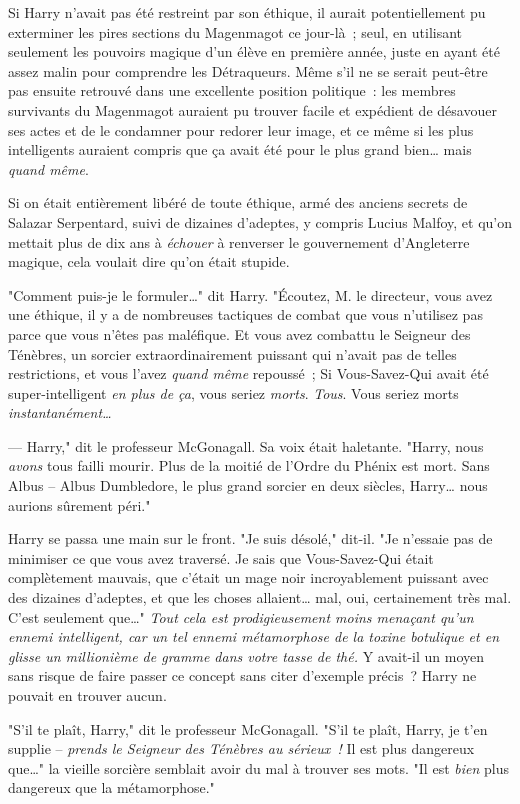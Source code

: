 Si Harry n'avait pas été restreint par son éthique, il aurait potentiellement pu exterminer les pires sections du Magenmagot ce jour-là~; seul, en utilisant seulement les pouvoirs magique d'un élève en première année, juste en ayant été assez malin pour comprendre les Détraqueurs. Même s'il ne se serait peut-être pas ensuite retrouvé dans une excellente position politique~: les membres survivants du Magenmagot auraient pu trouver facile et expédient de désavouer ses actes et de le condamner pour redorer leur image, et ce même si les plus intelligents auraient compris que ça avait été pour le plus grand bien… mais \emph{quand même}.

Si on était entièrement libéré de toute éthique, armé des anciens secrets de Salazar Serpentard, suivi de dizaines d'adeptes, y compris Lucius Malfoy, et qu'on mettait plus de dix ans à \emph{échouer} à renverser le gouvernement d'Angleterre magique, cela voulait dire qu'on était stupide.

"Comment puis-je le formuler…" dit Harry. "Écoutez, M. le directeur, vous avez une éthique, il y a de nombreuses tactiques de combat que vous n'utilisez pas parce que vous n'êtes pas maléfique. Et vous avez combattu le Seigneur des Ténèbres, un sorcier extraordinairement puissant qui n'avait pas de telles restrictions, et vous l'avez \emph{quand même} repoussé~; Si Vous-Savez-Qui avait été super-intelligent \emph{en plus de ça}, vous seriez \emph{morts}. \emph{Tous}. Vous seriez morts \emph{instantanément…}

--- Harry," dit le professeur McGonagall. Sa voix était haletante. "Harry, nous \emph{avons} tous failli mourir. Plus de la moitié de l'Ordre du Phénix est mort. Sans Albus -- Albus Dumbledore, le plus grand sorcier en deux siècles, Harry… nous aurions sûrement péri."

Harry se passa une main sur le front. "Je suis désolé," dit-il. "Je n'essaie pas de minimiser ce que vous avez traversé. Je sais que Vous-Savez-Qui était complètement mauvais, que c'était un mage noir incroyablement puissant avec des dizaines d'adeptes, et que les choses allaient… mal, oui, certainement très mal. C'est seulement que…" \emph{Tout cela est prodigieusement moins menaçant qu'un ennemi intelligent, car un tel ennemi métamorphose de la toxine botulique et en glisse un millionième de gramme dans votre tasse de thé.} Y avait-il un moyen sans risque de faire passer ce concept sans citer d'exemple précis~? Harry ne pouvait en trouver aucun.

"S'il te plaît, Harry," dit le professeur McGonagall. "S'il te plaît, Harry, je t'en supplie -- \emph{prends le Seigneur des Ténèbres au sérieux~!} Il est plus dangereux que…" la vieille sorcière semblait avoir du mal à trouver ses mots. "Il est \emph{bien} plus dangereux que la métamorphose."

